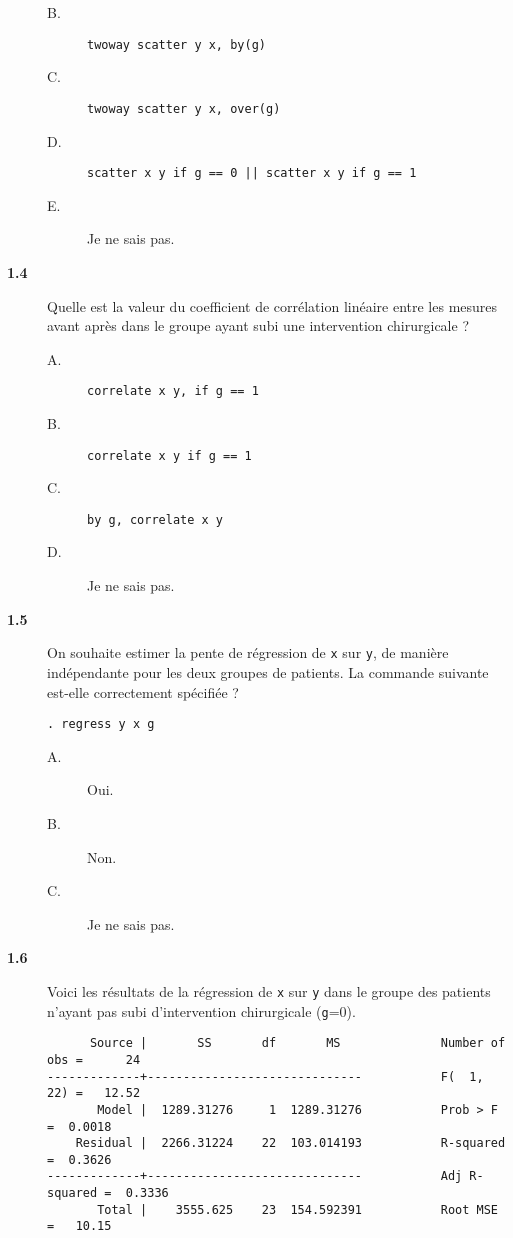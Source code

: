 \begin{description}
\begin{description}
\item[B.] \verb|twoway scatter y x, by(g)|
\item[C.] \verb|twoway scatter y x, over(g)|
\item[D.] \verb+scatter x y if g == 0 || scatter x y if g == 1+
\item[E.] Je ne sais pas.
\end{description}
\item[\bf 1.4] Quelle est la valeur du coefficient de corrélation linéaire
  entre les mesures avant après dans le groupe ayant subi une intervention
  chirurgicale ? 
\begin{description}
\item[A.] \verb|correlate x y, if g == 1|
\item[B.] \verb|correlate x y if g == 1|
\item[C.] \verb|by g, correlate x y|
\item[D.] Je ne sais pas.
\end{description}
\item[\bf 1.5] On souhaite estimer la pente de régression de \texttt{x} sur
  \texttt{y}, de manière indépendante pour les deux groupes de patients. La
  commande suivante est-elle correctement spécifiée ? 
\begin{verbatim}
. regress y x g
\end{verbatim}
\begin{description}
\item[A.] Oui.
\item[B.] Non.
\item[C.] Je ne sais pas.
\end{description}
\item[\bf 1.6]  Voici les résultats de la régression de \texttt{x} sur
  \texttt{y} dans le groupe des patients n'ayant pas subi d'intervention
  chirurgicale (\texttt{g}=0). 
\begin{verbatim}
      Source |       SS       df       MS              Number of obs =      24
-------------+------------------------------           F(  1,    22) =   12.52
       Model |  1289.31276     1  1289.31276           Prob > F      =  0.0018
    Residual |  2266.31224    22  103.014193           R-squared     =  0.3626
-------------+------------------------------           Adj R-squared =  0.3336
       Total |    3555.625    23  154.592391           Root MSE      =   10.15


\end{verbatim}
\end{description}
